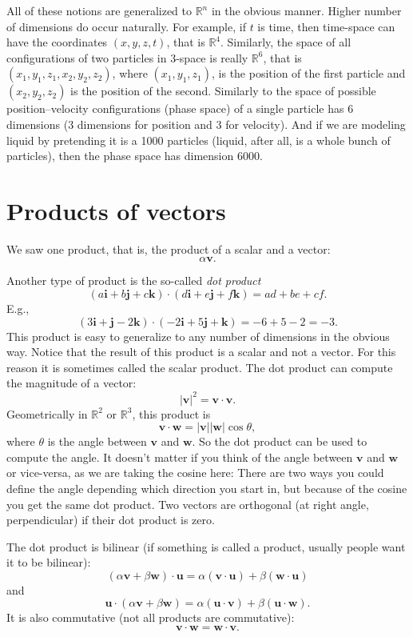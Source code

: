 \documentclass[12pt]{article}
\newcommand{\sabs}[1]{\lvert {#1} \rvert}
\newcommand{\R}{{\mathbb{R}}}
\newcommand{\veci}{\mathbf{i}}
\newcommand{\vecj}{\mathbf{j}}
\newcommand{\veck}{\mathbf{k}}
\begin{document}
All of these notions are generalized to $\R^n$ in the obvious manner.
Higher number of dimensions do occur naturally.
For example, if $t$ is time, then time-space can have the coordinates $(x,y,z,t)$,
that is $\R^4$.  Similarly, the space of all configurations of two particles in 3-space
is really $\R^6$, that is $(x_1,y_1,z_1,x_2,y_2,z_2)$, where
$(x_1,y_1,z_1)$, is the position of the first particle and $(x_2,y_2,z_2)$ is
the position of the second.
Similarly to the space of possible
position--velocity configurations (phase space)
of a single particle has 6 dimensions
(3 dimensions for position and 3 for velocity).
And if we are modeling liquid by pretending it
is a 1000 particles (liquid, after all,
is a whole bunch of particles),
then the phase space has dimension 6000.


\section{Products of vectors}

We saw one product, that is, the product of a scalar and a vector:
\[
\alpha \mathbf{v}.
\]

Another type of product is the so-called \emph{dot product}
\[
( a \veci + b \vecj + c \veck ) \cdot
( d \veci + e \vecj + f \veck ) =
ad + be + cf .
\]
E.g.,
\[
( 3 \veci + \vecj -2 \veck ) \cdot
( - 2\veci + 5 \vecj + \veck ) =
-6 + 5 -2 = -3 .
\]
This product is easy to generalize to any number of dimensions in the obvious way.
Notice that the result of this product is a scalar and not a vector.
For this reason it is sometimes called the scalar product.
The dot product can compute the magnitude of a vector:
\[
\sabs{\mathbf{v}}^2 = \mathbf{v} \cdot \mathbf{v} .
\]
Geometrically in $\R^2$ or $\R^3$, this product is
\[
\mathbf{v} \cdot \mathbf{w} = \sabs{\mathbf{v}} \sabs{\mathbf{w}} \cos \theta ,
\]
where $\theta$ is the angle between $\mathbf{v}$ and $\mathbf{w}$.
So the dot product can be used to compute the angle.
It doesn't matter if you think of the angle
between $\mathbf{v}$ and $\mathbf{w}$ or vice-versa, as we are taking the cosine here:
There are two ways you could define the angle depending which direction you start in,
but because of the cosine you get the same dot product.
Two vectors are orthogonal
(at right angle, perpendicular) if their dot product is zero.

The dot product is bilinear (if something is called a product, usually people want it to be bilinear):
\[
( \alpha \mathbf{v} + \beta \mathbf{w} ) \cdot \mathbf{u}
=
\alpha (\mathbf{v} \cdot \mathbf{u}) + \beta (\mathbf{w} \cdot \mathbf{u})
\]
and
\[
\mathbf{u} \cdot
( \alpha \mathbf{v} + \beta \mathbf{w} )
=
\alpha (\mathbf{u} \cdot \mathbf{v}) + \beta (\mathbf{u} \cdot \mathbf{w}) .
\]
It is also commutative (not all products are commutative):
\[
\mathbf{v} \cdot \mathbf{w} = \mathbf{w} \cdot \mathbf{v} .
\]
\end{document}
